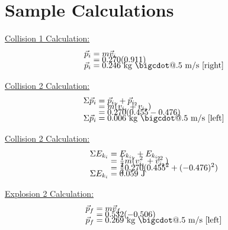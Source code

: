 \documentclass[12pt,letterpaper]{article}
\makeatletter
\newcommand{\sfrac}{\genfrac{}{}{}1}
\newcommand*\bigcdot{\mathpalette\bigcdot@{.5}}
\newcommand*\bigcdot@[2]{\mathbin{\vcenter{\hbox{\scalebox{#2}{$\m@th#1\bullet$}}}}}
\makeatother
\begin{document}
\section{Sample Calculations}
\vspace{-4mm}
\begin{minipage}[t]{0.3\textwidth}
	\underline{Collision 1  Calculation:}
	\vspace{-8mm}
	\[
		\begin{aligned}
			\vec{p}_{i} & = m\vec{v}_{i}                           \\[-8pt]
			            & = 0.270(0.911)                           \\[-8pt]
			\vec{p}_{i} & = 0.246~\text{kg $\bigcdot$ m/s [right]}
		\end{aligned}
	\]
\end{minipage}%
\hspace{0.5cm}
\begin{minipage}[t]{0.3\textwidth}
	\underline{Collision 2  Calculation:}
	\vspace{-8mm}
	\[
		\begin{aligned}
			\Sigma\vec{p}_{i} & = \vec{p}_{i_{1}} + \vec{p}_{i_{2}}     \\[-8pt]
			                  & = m(v_{i_{1}} + v_{i_{2}})              \\[-8pt]
			                  & = 0.270(0.455 - 0.476)                  \\[-8pt]
			\Sigma\vec{p}_{i} & = 0.006~\text{kg $\bigcdot$ m/s [left]}
		\end{aligned}
	\]
\end{minipage}%
\hspace{0.5cm}
\begin{minipage}[t]{0.3\textwidth}
	\underline{Collision 2  Calculation:}
	\vspace{-8mm}
	\[
		\begin{aligned}
			\Sigma E_{k_{i}} & = E_{k_{i_{1}}} + E_{k_{i_{2}}}            \\[-8pt]
			                 & = \sfrac{1}{2}m(v_{i_{1}}^2 + v_{i_{2}}^2) \\[-8pt]
			                 & = \sfrac{1}{2}0.270(0.455^2 + (-0.476)^2)  \\[-8pt]
			\Sigma E_{k_{i}} & = 0.059~\text{J}
		\end{aligned}
	\]
\end{minipage}%
\vspace{4mm}
\begin{minipage}[t]{0.3\textwidth}
	\underline{Explosion 2  Calculation:}
	\vspace{-8mm}
	\[
		\begin{aligned}
			\vec{p}_{f} & = m\vec{v}_{f}                          \\[-8pt]
			            & = 0.532(-0.506)                         \\[-8pt]
			\vec{p}_{f} & = 0.269~\text{kg $\bigcdot$ m/s [left]}
		\end{aligned}
	\]
\end{minipage}%
\end{document}
